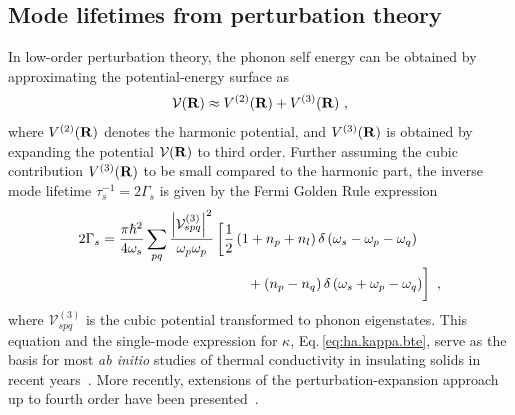 \subsection{Mode lifetimes from perturbation theory}
In low-order perturbation theory, the phonon self energy can be obtained by approximating the potential-energy surface as
\begin{align}
	\mathcal{V} (\b R) \approx V^{(2)} (\b R) + V^{(3)} (\b R)~,
	\label{eq:V3}
\end{align}
where $V^{(2)} ({\bf R})$ denotes the harmonic potential, and $V^{(3)} ({\bf R})$ is obtained by expanding the potential $\mathcal V ({\bf R})$ to third order. Further assuming the cubic contribution $V^{(3)} ({\bf R})$ to be small compared to the harmonic part, the inverse mode lifetime $\tau_s^{-1} = 2 \Gamma_s$ is given by the Fermi Golden Rule expression~\cite{Fabian1996}
\begin{align}
\begin{split}
	2 \Gamma_{s}=\frac{\pi \hbar^{2}}{4 \omega_{s}} \sum_{pq} \frac{\left|\mathcal V^{(3)}_{spq}\right|^{2}}{\omega_{p} \omega_{p}}
		&\left[ 
	  \frac{1}{2}\left(1+n_{p}+n_{l}\right) \delta\left(\omega_{s}-\omega_{p}-\omega_{q}\right) \right. \\
		&\left.~~~~ \phantom{\halb} + \left(n_{p}-n_{q}\right) \delta\left(\omega_{s}+\omega_{p}-\omega_{q}\right)\right]~,
\end{split}
\end{align}
where $\mathcal V^{(3)}_{spq}$ is the cubic potential transformed to phonon eigenstates. This equation and the single-mode expression for $\kappa$, Eq.\,\eqref{eq:ha.kappa.bte}, serve as the basis for most \emph{ab initio} studies of thermal conductivity in insulating solids in recent years~\cite{Broido2007,Simoncelli2019,Isaeva2019}. More recently, extensions of the perturbation-expansion approach up to fourth order have been presented~\cite{Feng2016,Feng2017,Ravichandran2018,Xia2018}.

